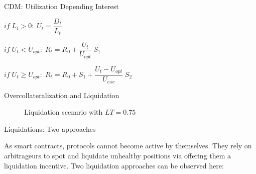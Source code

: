 \documentclass[handout]{beamer}
\begin{document}
\begin{frame}{CDM: Utilization Depending Interest }

\begin{figure}[t]
	\centering
	\begin{tikzpicture}[scale=1.0, every node/.style={scale=1.0}]
		
	\end{tikzpicture}
\end{figure}

$if \;L_t > 0 : \; U_t = \dfrac{D_t}{L_t}$

\vspace{1em}

$if \;  U_t < U_{opt} : \; R_t = R_0 + \dfrac{U_t} {U_{opt}}  \; S_1$

\vspace{1em}

$if \; U_t \geq U_{opt} : \; R_t = R_0 + S_1 + \dfrac{U_t - U_{opt}}{U_{exc}}\; S_2$
	
\end{frame}


\begin{frame}{Overcollateralization and Liquidation}

\begin{figure}[t]
	\centering
	\begin{tikzpicture}[scale=0.5, every node/.style={scale=0.8}]
		
	\end{tikzpicture}
	\caption{Liquidation scenario with $LT = 0.75$}
\end{figure}

	
\end{frame}


\begin{frame}{Liquidations: Two approaches }

As smart contracts, protocols cannot become active by themselves. They rely on arbitrageurs to spot and liquidate unhealthy positions via offering them a liquidation incentive. Two  liquidation approaches can be observed here:


	
\end{frame}
\end{document}
